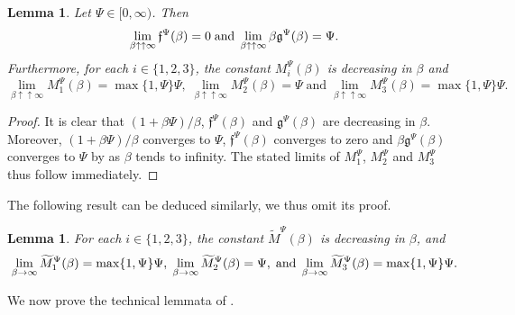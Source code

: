 \documentclass[10pt]{article} %
\newtheorem{lemma}[theorem]{Lemma}
\newcommand\ff{\mathfrak f}
\newcommand\fg{\mathfrak g}
\newcommand{\1}{\mathbf{1}}
\begin{document}
\begin{lemma}\label{lem::contraction_constants_reflected_bsde}
	Let $\Psi \in [0,\infty)$. Then
	\begin{equation*}
		\lim_{\beta \uparrow\uparrow\infty} \ff^\Psi(\beta) = 0 \; \text{\rm and} \; \lim_{\beta \uparrow\uparrow\infty} \beta \fg^\Psi(\beta) = \Psi.
	\end{equation*}
	Furthermore, for each $i \in \{1,2,3\}$, the constant $M^\Psi_i(\beta)$ is decreasing in $\beta$ and
	\begin{equation*}
		\lim_{\beta\uparrow\uparrow\infty} M^\Psi_1(\beta) =\max\{1,\Psi\}\Psi, \; \lim_{\beta\uparrow\uparrow\infty} M^\Psi_2(\beta) = \Psi \; \text{and} \; \lim_{\beta\uparrow\uparrow\infty} M^\Psi_3(\beta) = \max\{1,\Psi\}\Psi.
	\end{equation*}
\end{lemma}


\begin{proof}
	It is clear that $(1+\beta\Psi)/\beta$, $\ff^\Psi(\beta)$ and $\fg^\Psi(\beta)$ are decreasing in $\beta$. Moreover, $(1+\beta\Psi)/\beta$ converges to $\Psi$, $\ff^\Psi(\beta)$ converges to zero and $\beta\fg^\Psi(\beta)$ converges to $\Psi$ by  as $\beta$ tends to infinity. The stated limits of $M^\Psi_1$, $M^\Psi_2$ and $M^\Psi_3$ thus follow immediately.
\end{proof}

The following result can be deduced similarly, we thus omit its proof.

\begin{lemma}\label{lem::contraction_constants_bsde}
	For each $i \in \{1,2,3\}$, the constant $\widetilde M^\Psi(\beta)$ is decreasing in $\beta$, and
	\begin{equation*}
		\lim_{\beta\rightarrow\infty} \widetilde M^\Psi_1(\beta) =
			\max\{1,\Psi\}\Psi,
		\; 
		\lim_{\beta\rightarrow\infty} \widetilde M^\Psi_2(\beta) = \Psi, \; \text{\rm and} \; 
		 \lim_{\beta\rightarrow\infty} \widetilde M^\Psi_3(\beta) = \max\{1,\Psi\}\Psi.
	\end{equation*}
\end{lemma}


We now prove the technical lemmata of .
\end{document}
